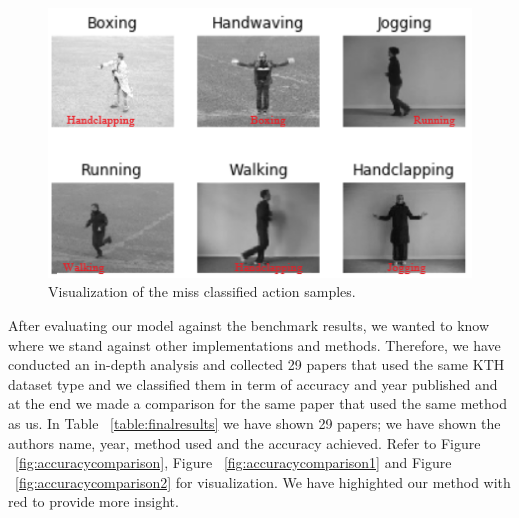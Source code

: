 \begin{figure}[ht]
\centering
\includegraphics[width=1.0\columnwidth]{Figures/missclassified.png}
\decoRule
\caption[Visualization of the miss classified action samples.]{Visualization of the miss classified action samples.}
\label{fig:missclassified1}
\end{figure}
After evaluating our model against the benchmark results, we wanted to know where we stand against other implementations and methods. Therefore, we have conducted an in-depth analysis and collected 29 papers that used the same KTH dataset type and we classified them in term of accuracy and year published and at the end we made a comparison for the same paper that used the same method as us. In Table ~\ref{table:finalresults} we have shown 29 papers; we have shown the authors name, year, method used and the accuracy achieved. Refer to Figure ~\ref{fig:accuracycomparison}, Figure ~\ref{fig:accuracycomparison1} and Figure ~\ref{fig:accuracycomparison2} for visualization. We have highighted our method with red to provide more insight.

